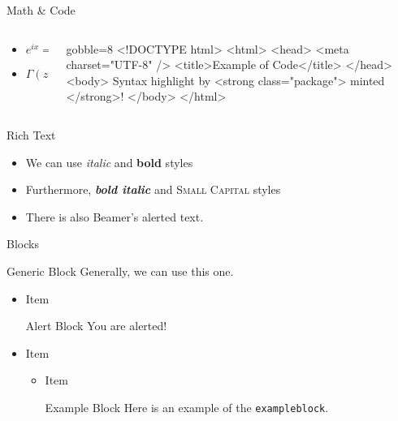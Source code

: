 \documentclass[12pt,t,hyperref={pdfencoding=auto}]{beamer}
\begin{document}
\begin{frame}[fragile]{Math \& Code}
  \begin{columns}
    \begin{column}{0.5\textwidth}
      \begin{itemize}
      \item $e^{ix} = \cos x + i \sin x$
      \item $\Gamma(z) = \int_0^\infty t^{z-1} e^{-t} dt$
      \end{itemize}
    \end{column}
    \begin{column}{0.5\textwidth}
      \begin{html*}{gobble=8}
        <!DOCTYPE html>
        <html>
          <head>
            <meta charset="UTF-8" />
            <title>Example of Code</title>
          </head>
          <body>
            Syntax highlight by
            <strong class="package">
              minted
            </strong>!
          </body>
        </html>
      \end{html*}
    \end{column}
  \end{columns}
\end{frame}


\begin{frame}{Rich Text}
  \begin{itemize}
  \item We can use \textit{italic} and \textbf{bold} styles
  \item Furthermore, \textit{\textbf{bold italic}} and \textsc{Small Capital} styles
  \item There is also Beamer's \alert{alerted text}.
  \end{itemize}
\end{frame}


\begin{frame}[fragile]{Blocks}
  \begin{block}{Generic Block}
    Generally, we can use this one.
  \end{block}

  \begin{itemize}
    \item Item
      \begin{alertblock}{Alert Block}
        You are alerted!
      \end{alertblock}
    \item Item
      \begin{itemize}
        \item Item
          \begin{exampleblock}{Example Block}
            Here is an example of the \verb|exampleblock|.
          \end{exampleblock}
      \end{itemize}
  \end{itemize}
\end{frame}
\end{document}
